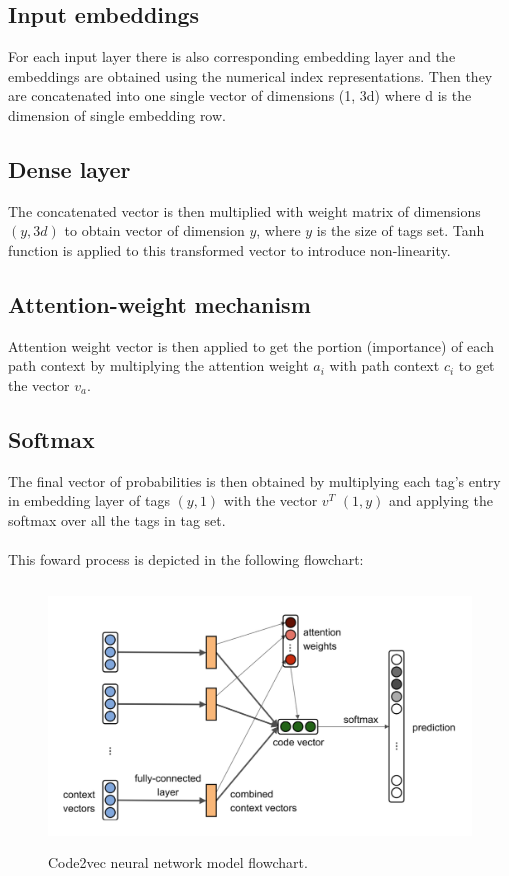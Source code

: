 \documentclass[10pt,english,a4paper]{report}
\begin{document}
\subsection{Input embeddings}
For each input layer there is also corresponding embedding layer and the embeddings are obtained 
using the numerical index representations. Then they are concatenated into one single vector
of dimensions (1, 3d) where d is the dimension of single embedding row. 

\subsection{Dense layer}
The concatenated vector is then multiplied with weight matrix of dimensions $(y, 3d)$ to obtain
vector of dimension $y$, where $y$ is the size of tags set. Tanh function is applied to this 
transformed vector to introduce non-linearity.

\subsection{Attention-weight mechanism}
Attention weight vector is then applied to get the portion (importance) of each path context
by multiplying the attention weight $a_i$ with path context $c_i$ to get the vector $v_a$.  

\subsection{Softmax}
The final vector of probabilities is then obtained by multiplying each tag's entry in 
embedding layer of tags $(y, 1)$ with the vector $v^T$ $(1,y)$ and applying the softmax 
over all the tags in tag set. \\ \\
This foward process is depicted in the following flowchart:

\begin{figure}[H]
    \centering
    \includegraphics[width=12cm, height=7cm]{figures/code2vec_model_visual.png} 
    \caption{Code2vec \cite{code2vec} neural network model flowchart.}
    \label{fig:func_lengths_distr_merged}
\end{figure}
\end{document}
